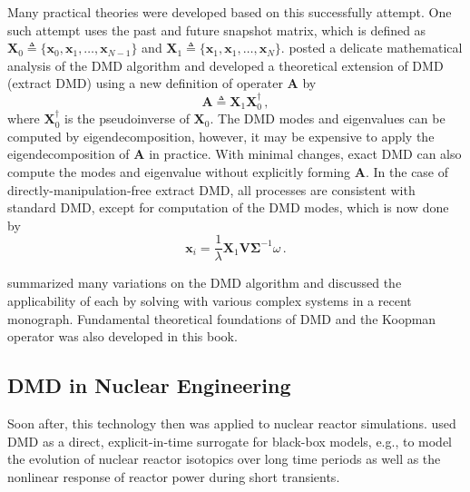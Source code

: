 Many practical theories were developed based on this successfully attempt.
One such attempt uses the past and future snapshot matrix, which is defined as $\mathbf{X}_0 \triangleq \{\mathbf{x}_0, \mathbf{x}_1, \ldots, \mathbf{x}_{N-1} \}$ and $\mathbf{X}_1 \triangleq \{\mathbf{x}_1, \mathbf{x}_1, \ldots, \mathbf{x}_{N} \} $. 
\citet{tu_dynamic_2014} posted a delicate mathematical analysis of the DMD algorithm and developed a theoretical extension of DMD (extract DMD) using a new definition of operater $\mathbf{A}$ by    
\begin{equation}
 \mathbf{A}\triangleq \mathbf{X}_1  \mathbf{X}_0^{\dagger}\, ,
 \label{eq:exact_dmd}
\end{equation}
where $\mathbf{X}_0^{\dagger}$ is the pseudoinverse of $\mathbf{X}_0$. 
The DMD modes and eigenvalues can be computed by eigendecomposition, however, it may be expensive to apply the eigendecomposition of $\mathbf{A}$ in practice.
With minimal changes, exact DMD can also compute the modes and eigenvalue without explicitly forming $\mathbf{A}$.
In the case of directly-manipulation-free extract DMD, all processes are consistent with standard DMD, except for computation of the DMD modes, which is now done by
\begin{equation}
 \mathbf{\mathbf{x}}_i = \frac{1}{\lambda} \mathbf{X}_1 \mathbf{V} \mathbf{\Sigma}^{-1} \omega \, .
 \label{eq:exact_dmd_free}
\end{equation}

\citet{kutz_dynamic_2016} summarized many variations on the DMD algorithm and discussed the applicability of each by solving with various complex systems in a recent monograph.
Fundamental theoretical foundations of DMD and the Koopman operator was also developed in this book.

\subsection{DMD in Nuclear Engineering}
Soon after, this technology then was applied to nuclear reactor simulations. 
\citet{abdo_data-driven_2018} used DMD as a direct, explicit-in-time surrogate for black-box models, e.g., to model the evolution of nuclear reactor isotopics over long time periods as well as the nonlinear response of reactor power during short transients.\cite{abdo_modeling_2019}\cite{elzohery2018comparison}

